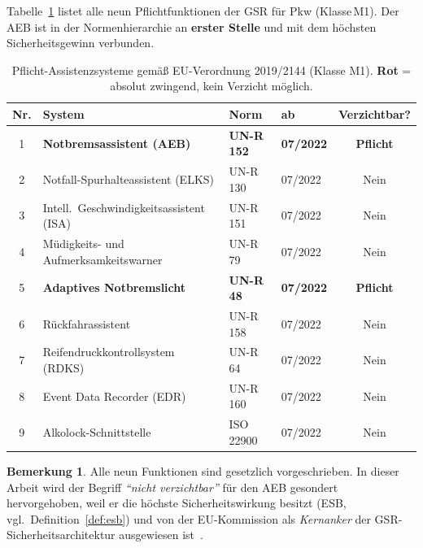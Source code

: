 \documentclass[a4paper,12pt]{article}
\theoremstyle{definition}
\newtheorem{bemerkung}{Bemerkung}
\begin{document}
Tabelle~\ref{tab:gsr_pflicht} listet alle neun Pflichtfunktionen der GSR
f\"ur Pkw (Klasse\,M1). Der AEB ist in der Normenhierarchie an
\textbf{erster Stelle} und mit dem h\"ochsten Sicherheitsgewinn verbunden.

\begin{table}[H]
\centering
\caption{Pflicht-Assistenzsysteme gem\"a\ss{} EU-Verordnung 2019/2144 (Klasse M1).
\textcolor{accentred}{\textbf{Rot}} = absolut zwingend, kein Verzicht m\"oglich.}
\label{tab:gsr_pflicht}
\renewcommand{\arraystretch}{1.40}
\begin{tabular}{@{}clllc@{}}
\toprule
\textbf{Nr.} & \textbf{System} & \textbf{Norm} & \textbf{ab} & \textbf{Verzichtbar?}\\
\midrule
\rowcolor{lightred}
1 & \textbf{Notbremsassistent (AEB)} & \textbf{UN-R 152} & \textbf{07/2022}
  & \textcolor{accentred}{\textbf{Pflicht}} \\
2 & Notfall-Spurhalteassistent (ELKS)  & UN-R 130        & 07/2022 & Nein \\
3 & Intell.\ Geschwindigkeitsassistent (ISA) & UN-R 151  & 07/2022 & Nein \\
4 & M\"udigkeits- und Aufmerksamkeitswarner  & UN-R 79   & 07/2022 & Nein \\
\rowcolor{lightred}
5 & \textbf{Adaptives Notbremslicht}   & \textbf{UN-R 48}& \textbf{07/2022}
  & \textcolor{accentred}{\textbf{Pflicht}} \\
6 & R\"uckfahrassistent                & UN-R 158        & 07/2022 & Nein \\
7 & Reifendruckkontrollsystem (RDKS)   & UN-R 64         & 07/2022 & Nein \\
8 & Event Data Recorder (EDR)          & UN-R 160        & 07/2022 & Nein \\
9 & Alkolock-Schnittstelle             & ISO 22900       & 07/2022 & Nein \\
\bottomrule
\end{tabular}
\end{table}

\begin{bemerkung}
Alle neun Funktionen sind gesetzlich vorgeschrieben. In dieser Arbeit wird
der Begriff \emph{``nicht verzichtbar''} f\"ur den AEB gesondert hervorgehoben,
weil er die h\"ochste Sicherheitswirkung besitzt (ESB, vgl.\
Definition~\ref{def:esb}) und von der EU-Kommission als
\emph{Kernanker} der GSR-Sicherheitsarchitektur ausgewiesen ist~\cite{eu2019gsr}.
\end{bemerkung}
\end{document}
